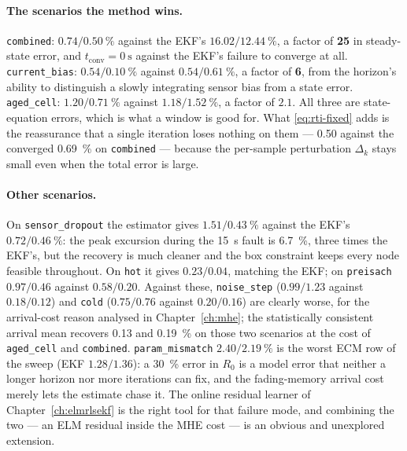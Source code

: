 \paragraph{The scenarios the method wins.}  \texttt{combined}: $0.74/\SI{0.50}{\percent}$ against
the EKF's $16.02/\SI{12.44}{\percent}$, a factor of \textbf{25} in steady-state error, and
$t_\text{conv} = \SI{0}{\second}$ against the EKF's failure to converge at all.
\texttt{current\_bias}: $0.54/\SI{0.10}{\percent}$ against $0.54/\SI{0.61}{\percent}$, a factor of
\textbf{6}, from the horizon's ability to distinguish a slowly integrating sensor bias from a state
error.  \texttt{aged\_cell}: $1.20/\SI{0.71}{\percent}$ against $1.18/\SI{1.52}{\percent}$, a factor
of $2.1$.  All three are state-equation errors, which is what a window is good for.  What
\cref{eq:rti-fixed} adds is the reassurance that a single iteration loses nothing on them ---
\SI{0.50}{} against the converged \SI{0.69}{\percent} on \texttt{combined} --- because the
per-sample perturbation $\Delta_k$ stays small even when the total error is large.

\paragraph{Other scenarios.}  On \texttt{sensor\_dropout} the estimator gives
$1.51/\SI{0.43}{\percent}$ against the EKF's $0.72/\SI{0.46}{\percent}$: the peak excursion during
the \SI{15}{\second} fault is \SI{6.7}{\percent}, three times the EKF's, but the recovery is much
cleaner and the box constraint keeps every node feasible throughout.  On \texttt{hot} it gives
$0.23/0.04$, matching the EKF; on \texttt{preisach} $0.97/0.46$ against $0.58/0.20$.  Against
these, \texttt{noise\_step} ($0.99/1.23$ against $0.18/0.12$) and \texttt{cold} ($0.75/0.76$
against $0.20/0.16$) are clearly worse, for the arrival-cost reason analysed in
Chapter~\ref{ch:mhe}; the statistically consistent arrival mean recovers \SI{0.13}{} and
\SI{0.19}{\percent} on those two scenarios at the cost of \texttt{aged\_cell} and
\texttt{combined}.  \texttt{param\_mismatch} $2.40/\SI{2.19}{\percent}$ is the worst ECM row of the
sweep (EKF $1.28/1.36$): a \SI{30}{\percent} error in $R_0$ is a model error that neither a longer
horizon nor more iterations can fix, and the fading-memory arrival cost merely lets the estimate
chase it.  The online residual learner of Chapter~\ref{ch:elmrlsekf} is the right tool for that
failure mode, and combining the two --- an ELM residual inside the MHE cost --- is an obvious and
unexplored extension.

